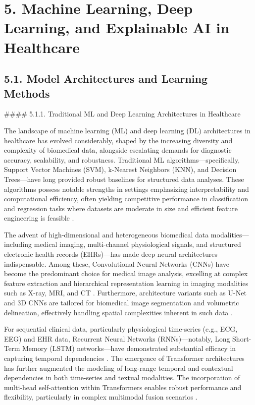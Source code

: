 \documentclass[11pt]{article}
\begin{document}
\section{5. Machine Learning, Deep Learning, and Explainable AI in Healthcare}

\subsection{5.1. Model Architectures and Learning Methods}

#### 5.1.1. Traditional ML and Deep Learning Architectures in Healthcare

The landscape of machine learning (ML) and deep learning (DL) architectures in healthcare has evolved considerably, shaped by the increasing diversity and complexity of biomedical data, alongside escalating demands for diagnostic accuracy, scalability, and robustness. Traditional ML algorithms—specifically, Support Vector Machines (SVM), k-Nearest Neighbors (KNN), and Decision Trees—have long provided robust baselines for structured data analyses. These algorithms possess notable strengths in settings emphasizing interpretability and computational efficiency, often yielding competitive performance in classification and regression tasks where datasets are moderate in size and efficient feature engineering is feasible \cite{ref16,ref28}.

The advent of high-dimensional and heterogeneous biomedical data modalities—including medical imaging, multi-channel physiological signals, and structured electronic health records (EHRs)—has made deep neural architectures indispensable. Among these, Convolutional Neural Networks (CNNs) have become the predominant choice for medical image analysis, excelling at complex feature extraction and hierarchical representation learning in imaging modalities such as X-ray, MRI, and CT \cite{ref28,ref31,ref50,ref55,ref70,ref71,ref72,ref74,ref75,ref90,ref107}. Furthermore, architecture variants such as U-Net and 3D CNNs are tailored for biomedical image segmentation and volumetric delineation, effectively handling spatial complexities inherent in such data \cite{ref49,ref50,ref56,ref53}.

For sequential clinical data, particularly physiological time-series (e.g., ECG, EEG) and EHR data, Recurrent Neural Networks (RNNs)—notably, Long Short-Term Memory (LSTM) networks—have demonstrated substantial efficacy in capturing temporal dependencies \cite{ref29,ref42,ref43,ref55}. The emergence of Transformer architectures has further augmented the modeling of long-range temporal and contextual dependencies in both time-series and textual modalities. The incorporation of multi-head self-attention within Transformers enables robust performance and flexibility, particularly in complex multimodal fusion scenarios \cite{ref28,ref31,ref35,ref48,ref49,ref54,ref65,ref76,ref77,ref90}.
\end{document}
